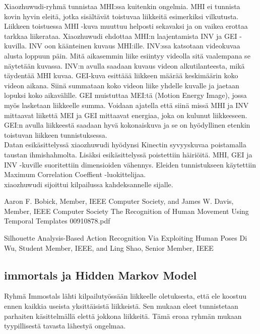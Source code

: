 Xiaozhuwudi-ryhmä tunnistaa MHI:ssa kuitenkin ongelmia. MHI ei tunnista kovin hyvin eleitä, jotka sisältävät toistuvaa liikkeitä esimerkiksi vilkutusta.
Liikkeen toistuessa MHI -kuva muuttuu helposti sekavaksi ja on vaikea erottaa tarkkaa liikerataa. Xiaozhuwudi ehdottaa MHI:n laajentamista INV ja GEI -kuvilla.
INV oon käänteinen kuvaus MHI:ille. INV:ssa katsotaan videokuvaa alusta loppuun päin.
Mitä aikasemmin liike esiintyy videolla sitä vaalempana se näytetään kuvassa. INV:n avulla saadaan kuvaus videon alkutilanteesta, mikä täydentää MHI kuvaa. 
GEI-kuva esittäää liikkeen määrää keskimäärin koko videon aikana. Siinä summataan koko videon liike yhdelle kuvalle ja jaetaan lopuksi koko aikavälille.
GEI muistuttaa MEI:tä (Motion Energy Image), jossa myös lasketaan liikkeelle summa. Voidaan ajatella että siinä missä MHI ja INV mittaavat liikettä 
MEI ja GEI mittaavat energiaa, joka on kulunut liikkeeseen. GEI:n avulla liikkeestä saadaan hyvä kokonaiskuva ja se on hyödyllinen etenkin toistuvan
liikkeen tunnistuksessa. \\

Datan esikäsittelyssä xiaozhuwudi hyödynsi Kinectin syvyyskuvaa poistamalla taustan ihmishahmolta. Lisäksi esikäsittelyssä poistettiin häiriöitä.
MHI, GEI ja INV -kuville suoritettiin dimensioiden vähennys. Eleiden tunnistukseen käytettiin Maximum Correlation Coeffient -luokittelijaa.\\

xiaozhuwudi sijoittui kilpailussa kahdeksannelle sijalle. 


Aaron F. Bobick, Member, IEEE Computer Society, and
James W. Davis, Member, IEEE Computer Society
The Recognition of Human Movement Using Temporal Templates
00910878.pdf

Silhouette Analysis-Based Action Recognition Via
Exploiting Human Poses
Di Wu, Student Member, IEEE, and Ling Shao, Senior Member, IEEE


\subsection{immortals ja Hidden Markov Model}

Ryhmä Immostals lähti kilpailutyössään liikkeelle oletuksesta, että ele koostuu ennen kaikkia useista yksittäisistä liikkeistä. 
Sen mukaan eleet tunnistetaan parhaiten käsittelmällä elettä jokkona liikkeitä. Tämä eroaa ryhmän mukaan tyypillisestä 
tavasta lähestyä ongelmaa.\\

